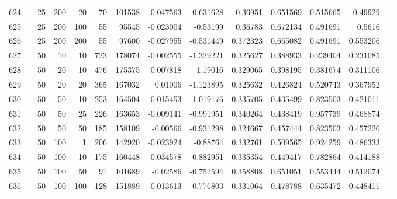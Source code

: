 \begin{longtable}{llrrrrrrrrrrrr}
		624 & &           25 &               200 &           20 &          70 &     101538 & -0.047563 & -0.631628 &   0.36951 &    0.651569 &       0.515665 &   0.49929 \\
		625 & &           25 &               200 &          100 &          55 &      95545 & -0.023004 &  -0.53199 &   0.36783 &    0.672134 &       0.491691 &    0.5616 \\
		626 & &           25 &               200 &          200 &          55 &      97600 & -0.027955 & -0.531449 &  0.372323 &    0.665082 &       0.491691 &  0.553206 \\
		627 & &           50 &                10 &           10 &         723 &     178074 & -0.002555 & -1.329221 &  0.325627 &    0.388933 &       0.239404 &  0.231085 \\
		628 & &           50 &                20 &           10 &         476 &     175375 &  0.007818 &  -1.19016 &  0.329065 &    0.398195 &       0.381674 &  0.311106 \\
		629 & &           50 &                20 &           20 &         365 &     167032 &   0.01006 & -1.123895 &  0.325632 &    0.426824 &       0.520743 &  0.367952 \\
		630 & &           50 &                50 &           10 &         253 &     164504 & -0.015453 & -1.019176 &  0.335705 &    0.435499 &       0.823503 &  0.421011 \\
		631 & &           50 &                50 &           25 &         226 &     163653 & -0.009141 & -0.991951 &  0.340264 &    0.438419 &       0.957739 &  0.468874 \\
		632 & &           50 &                50 &           50 &         185 &     158109 &  -0.00566 & -0.931298 &  0.324667 &    0.457444 &       0.823503 &  0.457226 \\
		633 & &           50 &               100 &            1 &         206 &     142920 & -0.023924 &  -0.88764 &  0.332761 &    0.509565 &       0.924259 &  0.486333 \\
		634 & &           50 &               100 &           10 &         175 &     160448 & -0.034578 & -0.882951 &  0.335354 &    0.449417 &       0.782864 &  0.414188 \\
		635 & &           50 &               100 &           50 &          91 &     101689 &  -0.02586 & -0.752594 &  0.358808 &    0.651051 &       0.553444 &  0.512074 \\
		636 & &           50 &               100 &          100 &         128 &     151889 & -0.013613 & -0.776803 &  0.331064 &    0.478788 &       0.635472 &  0.448411 \\

\end{longtable}
